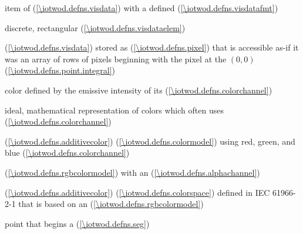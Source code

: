 %
item of  (\ref{\iotwod.defns.visdata}) with a defined  (\ref{\iotwod.defns.visdatafmt})

discrete, rectangular  (\ref{\iotwod.defns.visdataelem})

%
%
  (\ref{\iotwod.defns.visdata}) stored as  (\ref{\iotwod.defns.pixel}) that is accessible as-if it was an array of rows of pixels beginning with the pixel at the  $(0,0)$ (\ref{\iotwod.defns.point.integral})

%
color defined by the emissive intensity of its  (\ref{\iotwod.defns.colorchannel})

%
ideal, mathematical representation of colors which often uses  (\ref{\iotwod.defns.colorchannel})

%
%
  (\ref{\iotwod.defns.additivecolor})  (\ref{\iotwod.defns.colormodel}) using red, green, and blue  (\ref{\iotwod.defns.colorchannel})

%
%
  (\ref{\iotwod.defns.rgbcolormodel}) with an  (\ref{\iotwod.defns.alphachannel})

%
%
  (\ref{\iotwod.defns.additivecolor})  (\ref{\iotwod.defns.colorspace}) defined in IEC 61966-2-1 that is based on an  (\ref{\iotwod.defns.rgbcolormodel})

%
point that begins a  (\ref{\iotwod.defns.seg})

